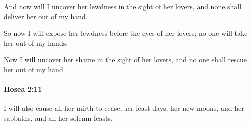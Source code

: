 			\begin{versebox}
					\item[BHS] 
					\item[LXX] 
					\item[ASV] And now will I uncover her lewdness in the sight of her lovers, and none shall deliver her out of my hand.
					\item[NIV] So now I will expose her lewdness before the eyes of her lovers; no one will take her out of my hands.
					\item[NRSV] Now I will uncover her shame in the sight of her lovers, and no one shall rescue her out of my hand.
			\end{versebox}

		\paragraph{Hosea 2:11} %
			\label{HOSEA-2-11}

			I will also cause all her mirth to cease, her feast days, her new moons, and her sabbaths, and all her solemn feasts.

